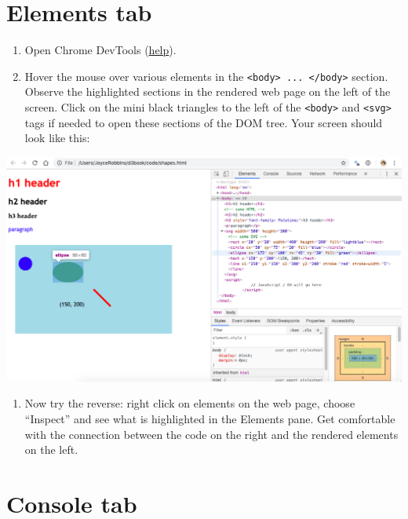 \documentclass[openany]{book}
\providecommand{\tightlist}{%
  \setlength{\itemsep}{0pt}\setlength{\parskip}{0pt}}
\begin{document}
\hypertarget{elements-tab}{%
\section{Elements tab }\label{elements-tab}}

\begin{enumerate}
\def\labelenumi{\arabic{enumi}.}
\item
  Open Chrome DevTools (\href{index.html\#javascript-console}{help}).
\item
  Hover the mouse over various elements in the \texttt{\textless{}body\textgreater{}\ ...\ \textless{}/body\textgreater{}} section. Observe the highlighted sections in the rendered web page on the left of the screen. Click on the mini black triangles to the left of the \texttt{\textless{}body\textgreater{}} and \texttt{\textless{}svg\textgreater{}} tags if needed to open these sections of the DOM tree. Your screen should look like this:
\end{enumerate}

\begin{center}\includegraphics[width=0.8\linewidth]{images/elements} \end{center}

\begin{enumerate}
\def\labelenumi{\arabic{enumi}.}
\setcounter{enumi}{2}
\tightlist
\item
  Now try the reverse: right click on elements on the web page, choose ``Inspect'' and see what is highlighted in the Elements pane. Get comfortable with the connection between the code on the right and the rendered elements on the left.
\end{enumerate}

\hypertarget{console-tab}{%
\section{Console tab }\label{console-tab}}
\end{document}
